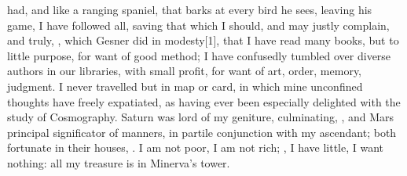 {had, and like a ranging spaniel, that barks at every bird he sees,
leaving his game, I have followed all, saving that which I should, and
may justly complain, and truly, , which
Gesner did in modesty[1\baselineskip], that I have read many books, but to little
purpose, for want of good method; I have confusedly tumbled over diverse
authors in our libraries, with small profit, for want of art, order,
memory, judgment. I never travelled but in map or card, in which mine
unconfined thoughts have freely expatiated, as having ever been
especially delighted with the study of Cosmography. Saturn was lord
of my geniture, culminating, \etc, and Mars principal significator of
manners, in partile conjunction with my ascendant; both fortunate in
their houses, \etc. I am not poor, I am not rich; ,
I have little, I want nothing: all my treasure is in Minerva's tower.

}
